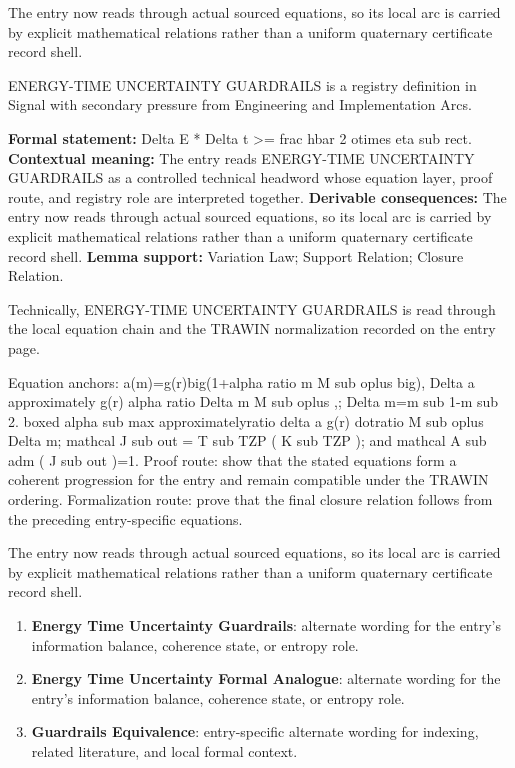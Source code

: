 The entry now reads through actual sourced equations, so its local arc is carried by explicit mathematical relations rather than a uniform quaternary certificate record shell.
\clearpage


\begingroup\small
{}
ENERGY-TIME UNCERTAINTY GUARDRAILS is a registry definition in Signal with secondary pressure from Engineering and Implementation Arcs.

\begingroup\footnotesize\setlength{\emergencystretch}{3em}\sloppy
\textbf{Formal statement:} Delta E * Delta t >= frac hbar 2 otimes eta sub rect. \textbf{Contextual meaning:} The entry reads ENERGY-TIME UNCERTAINTY GUARDRAILS as a controlled technical headword whose equation layer, proof route, and registry role are interpreted together. \textbf{Derivable consequences:} The entry now reads through actual sourced equations, so its local arc is carried by explicit mathematical relations rather than a uniform quaternary certificate record shell. \textbf{Lemma support:} Variation Law; Support Relation; Closure Relation.\par
\endgroup

Technically, ENERGY-TIME UNCERTAINTY GUARDRAILS is read through the local equation chain and the TRAWIN normalization recorded on the entry page.

Equation anchors: a(m)=g(r)big(1+alpha ratio m M sub oplus big), Delta a approximately g(r) alpha ratio Delta m M sub oplus ,; Delta m=m sub 1-m sub 2. boxed alpha sub max approximatelyratio delta a g(r) dotratio M sub oplus Delta m; mathcal J sub out = T sub TZP ( K sub TZP ); and mathcal A sub adm ( J sub out )=1. Proof route: show that the stated equations form a coherent progression for the entry and remain compatible under the TRAWIN ordering. Formalization route: prove that the final closure relation follows from the preceding entry-specific equations.

The entry now reads through actual sourced equations, so its local arc is carried by explicit mathematical relations rather than a uniform quaternary certificate record shell.
\endgroup

\begin{enumerate}[leftmargin=1.6em,itemsep=6pt,topsep=4pt]
\item \textbf{Energy Time Uncertainty Guardrails}: alternate wording for the entry's information balance, coherence state, or entropy role.
\item \textbf{Energy Time Uncertainty Formal Analogue}: alternate wording for the entry's information balance, coherence state, or entropy role.
\item \textbf{Guardrails Equivalence}: entry-specific alternate wording for indexing, related literature, and local formal context.
\end{enumerate}

